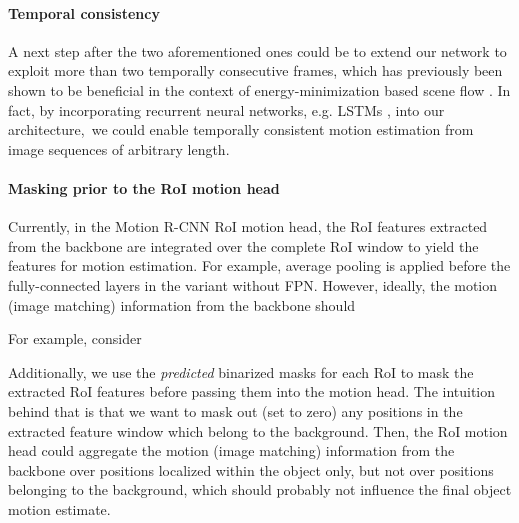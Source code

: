 \paragraph{Temporal consistency}
A next step after the two aforementioned ones could be to extend our network to exploit more than two
temporally consecutive frames, which has previously been shown to be beneficial in the
context of energy-minimization based scene flow \cite{TemporalSF}.
In fact, by incorporating recurrent neural networks, e.g. LSTMs \cite{LSTM},
into our architecture, we could enable temporally consistent motion estimation
from image sequences of arbitrary length.

\paragraph{Masking prior to the RoI motion head}
Currently, in the Motion R-CNN RoI motion head, the RoI features extracted from
the backbone are integrated over the complete RoI window to yield the features
for motion estimation.
For example, average pooling is applied before the fully-connected layers in the variant without FPN.
However, ideally, the motion (image matching) information from the backbone should

For example, consider

Additionally, we use the \emph{predicted} binarized masks for each RoI to mask the
extracted RoI features before passing them into the motion head.
The intuition behind that is that we want to mask out (set to zero) any positions in the
extracted feature window which belong to the background. Then, the RoI motion
head could aggregate the motion (image matching) information from the backbone
over positions localized within the object only, but not over positions belonging
to the background, which should probably not influence the final object motion estimate.
